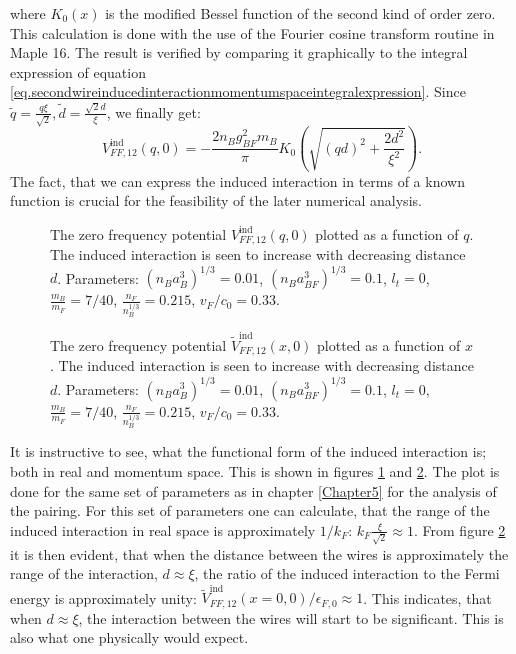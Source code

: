 where $K_0(x)$ is the modified Bessel function of the second kind of order zero. This calculation is done with the use of the Fourier cosine transform routine in Maple 16. The result is verified by comparing it graphically to the integral expression of equation \eqref{eq.secondwireinducedinteractionmomentumspaceintegralexpression}. Since $\tilde{q} = \frac{q\xi}{\sqrt{2}}, \tilde{d} = \frac{\sqrt{2}d}{\xi}$, we finally get:
 \begin{equation}
V^\text{ind}_{FF,12}(q,0) = -\frac{2n_Bg^2_{BF}m_B}{\pi}K_0\left(\sqrt{(qd)^2+\frac{2d^2}{\xi^2}}\right). 
\label{eq.VFF12indq}
\end{equation}
The fact, that we can express the induced interaction in terms of a known function is crucial for the feasibility of the later numerical analysis. 

\begin{figure} 
\begin{center}  
  
\caption{The zero frequency potential $V_{FF,12}^\text{ind}(q,0)$ plotted as a function of $q$. The induced interaction is seen to increase with decreasing distance $d$. Parameters: $(n_Ba_B^3)^{1/3} = 0.01$, $(n_Ba_{BF}^3)^{1/3} = 0.1$, $l_t = 0$, $\frac{m_B}{m_F} = 7/40$, $\frac{n_F}{n_B^{1/3}} = 0.215$, $v_F/c_0 = 0.33$.}  
\label{fig.VFF12indq}  
\end{center}    
\end{figure}

\begin{figure} 
\begin{center}  
  
\caption{The zero frequency potential $\tilde{V}_{FF,12}^\text{ind}(x,0)$ plotted as a function of $x$. The induced interaction is seen to increase with decreasing distance $d$. Parameters: $(n_Ba_B^3)^{1/3} = 0.01$, $(n_Ba_{BF}^3)^{1/3} = 0.1$, $l_t = 0$, $\frac{m_B}{m_F} = 7/40$, $\frac{n_F}{n_B^{1/3}} = 0.215$, $v_F/c_0 = 0.33$.}  
\label{fig.VFF12indx}  
\end{center}    
\end{figure}

It is instructive to see, what the functional form of the induced interaction is; both in real and momentum space.  This is shown in figures \ref{fig.VFF12indq} and \ref{fig.VFF12indx}. The plot is done for the same set of parameters as in chapter \ref{Chapter5} for the analysis of the pairing. For this set of parameters one can calculate, that the range of the induced interaction in real space is approximately $1/k_F$: $k_F\frac{\xi}{\sqrt{2}} \approx 1$. From figure \ref{fig.VFF12indx} it is then evident, that when the distance between the wires is approximately the range of the interaction, $d\approx \xi$, the ratio of the induced interaction to the Fermi energy is approximately unity: $\tilde{V}_{FF,12}^\text{ind}(x=0,0)/\epsilon_{F,0} \approx 1$. This indicates, that when $d \approx \xi$, the interaction between the wires will start to be significant. This is also what one physically would expect. 




